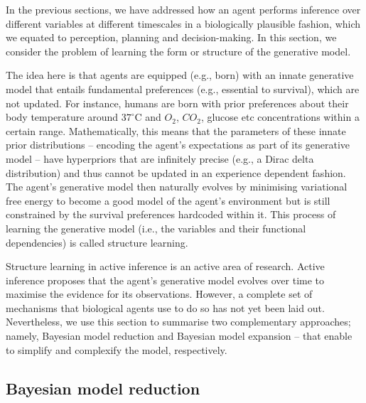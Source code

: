 \documentclass[review,12pt,authoryear]{elsarticle}
\begin{document}
In the previous sections, we have addressed how an agent performs inference over different variables at different timescales in a biologically plausible fashion, which we equated to perception, planning and decision-making. In this section, we consider the problem of learning the form or structure of the generative model.

The idea here is that agents are equipped (e.g., born) with an innate generative model that entails fundamental preferences (e.g., essential to survival), which are not updated. For instance, humans are born with prior preferences about their body temperature around $37^\circ$C and $O_2$, $CO_2$, glucose etc concentrations within a certain range. Mathematically, this means that the parameters of these innate prior distributions -- encoding the agent’s expectations as part of its generative model -- have hyperpriors that are infinitely precise (e.g., a Dirac delta distribution) and thus cannot be updated in an experience dependent fashion. The agent’s generative model then naturally evolves by minimising variational free energy to become a good model of the agent’s environment but is still constrained by the survival preferences hardcoded within it. This process of learning the generative model (i.e., the variables and their functional dependencies) is called structure learning.

Structure learning in active inference is an active area of research. Active inference proposes that the agent’s generative model evolves over time to maximise the evidence for its observations. However, a complete set of mechanisms that biological agents use to do so has not yet been laid out. Nevertheless, we use this section to summarise two complementary approaches; namely, Bayesian model reduction and Bayesian model expansion \citep{fristonActiveInferenceCuriosity2017,fristonPostHocBayesian2011,smithActiveInferenceModel2019,fristonBayesianModelReduction2018} – that enable to simplify and complexify the model, respectively.

\subsection{Bayesian model reduction}
\end{document}
